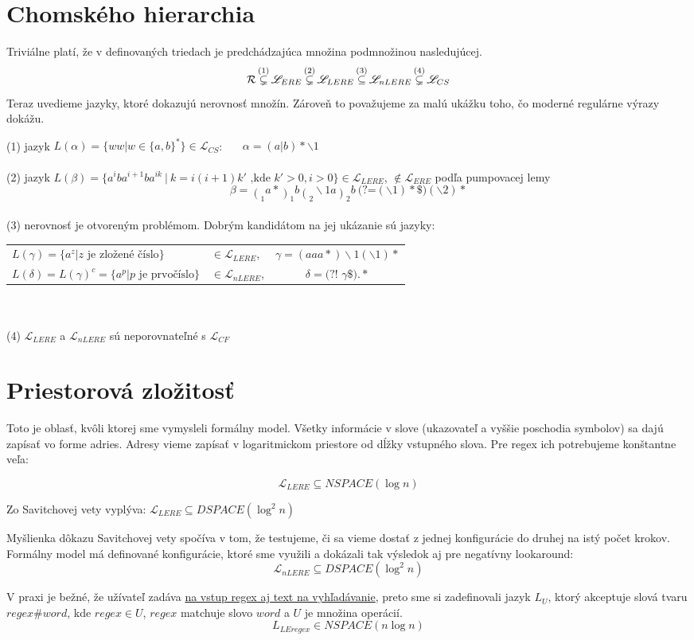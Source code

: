 \documentclass[myposter,portrait,plainboxedsections]{sciposter}
\def\R{{\cal R}} %
\def\L{\mathscr{L}} %
\def\le{LEregex}
\def\el{\mathscr{L}_{ERE}}
\def\lel{\mathscr{L}_{LERE}}
\def\nlel{\mathscr{L}_{nLERE}}
\def\lookahead{\text{(?=}}
\def\nlookahead{\text{(?!~}}
\def\mysection#1{
{\color{sectionCol}\section*{\sc\bfseries #1}}}
\begin{document}
\begin{multicols*}{3}
\mysection{Chomského hierarchia}
Triviálne platí, že v definovaných triedach je predchádzajúca množina podmnožinou nasledujúcej.
$$\R \mathop{\subsetneq}^{(1)} \el \mathop{\subsetneq}^{(2)} \lel \mathop{\subseteq}^{(3)} \nlel \mathop{\subsetneq}^{(4)} \L_{CS}$$
Teraz uvedieme jazyky, ktoré dokazujú nerovnosť množín. Zároveň to považujeme za malú ukážku toho, čo moderné regulárne výrazy dokážu.

(1) jazyk $L(\alpha) = \lbrace ww|w \in\lbrace a,b \rbrace^* \rbrace \in \L_{CS}$:~~~ $\alpha = (a|b)*\backslash 1$
\\ \\
(2) jazyk $L(\beta)=\lbrace a^iba^{i+1}ba^{ik} ~|~ k=i(i+1)k' \text{ ,kde } k'>0,i>0\rbrace \in \lel$, $\notin \el$ podľa pumpovacej lemy \cite{ExtendedRegexPower}
$$\beta=\mathop{(}_1 a*\mathop{)}_1 b \mathop{(}_2 \backslash 1 a \mathop{)}_2 b~ \lookahead (\backslash 1) *\$ ) (\backslash 2)* $$
\\ 
(3) nerovnosť je otvoreným problémom. Dobrým kandidátom na jej ukázanie sú jazyky:

\begin{tabular}{llc}
$L(\gamma) = \lbrace a^z | z \text{ je zložené číslo} \rbrace$ & $\in\lel$, & $\gamma = (aaa*)\backslash 1(\backslash 1)*$ \\
$L(\delta) = L(\gamma)^c = \lbrace a^p | p \text{ je prvočíslo} \rbrace$ & $\in\nlel$, & $\delta=\nlookahead \gamma\$).*$
\end{tabular}
\\ \\
(4) $\lel$ a $\nlel$ sú neporovnateľné s $\L_{CF}$

\mysection{Priestorová zložitosť}
Toto je oblasť, kvôli ktorej sme vymysleli formálny model. Všetky informácie v slove (ukazovateľ a vyššie poschodia symbolov) sa dajú zapísať vo forme adries. Adresy vieme zapísať v logaritmickom priestore od dĺžky vstupného slova. Pre regex ich potrebujeme konštantne veľa:

$$\lel \subseteq NSPACE(\log n)$$

Zo Savitchovej vety vyplýva:
$\lel \subseteq DSPACE(\log^2 n)$

Myšlienka dôkazu Savitchovej vety spočíva v tom, že testujeme, či sa vieme dostať z jednej konfigurácie do druhej na istý počet krokov. Formálny model má definované konfigurácie, ktoré sme využili a dokázali tak výsledok aj pre negatívny lookaround:
$$\nlel \subseteq DSPACE(\log^2 n)$$

V praxi je bežné, že užívateľ zadáva \underline{na vstup regex aj text na vyhľadávanie}, preto sme si zadefinovali jazyk $L_U$, ktorý akceptuje slová tvaru $regex\#word$, kde $regex\in U$, $regex$ matchuje slovo $word$ a $U$ je množina operácií.
$$L_{\le} \in NSPACE(n \log n)$$


\end{multicols*}
\end{document}

